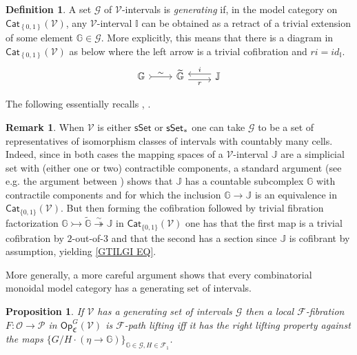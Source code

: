 \documentclass[a4paper,10pt
,draft
]{article}%
\numberwithin{equation}{section}
\numberwithin{figure}{section}
\newtheorem{proposition}[equation]{Proposition}%
\theoremstyle{definition} %
\newtheorem{definition}[equation]{Definition}%
\newtheorem{remark}[equation]{Remark}%
\newcommand{\set}[1]{\left\{#1\right\}}%
\newcommand{\Cat}{\mathsf{Cat}}
\newcommand{\F}{\ensuremath{\mathcal F}}
\newcommand{\V}{\ensuremath{\mathcal V}}
\renewcommand{\O}{\ensuremath{\mathcal O}}
\renewcommand{\P}{\ensuremath{\mathcal P}}
\newcommand{\1}{\ensuremath{\mathbbm 1}}%
\begin{document}
\begin{definition}
	A set $\mathscr{G}$ of $\V$-intervals is \textit{generating} if,
	in the model category on $\Cat_{\set{0,1}}(\V)$,
	any $\V$-interval $\mathbb{I}$ can be obtained
	as a retract of a trivial extension of some element
	$\mathbb{G} \in \mathscr{G}$.
	More explicitly, this means that there is a diagram in 
	$\Cat_{\set{0,1}}(\V)$ as below
	where the left arrow is a trivial cofibration and
	$ri = id_{\mathbb{I}}$.
\begin{equation}\label{GTILGI EQ}
	\begin{tikzcd}
		\mathbb{G} \arrow[r,rightarrowtail, "\sim"]
	&
		\widetilde{\mathbb{G}} \arrow[r,yshift=-.3em, "r"']
	&
		\mathbb{J} \arrow[l,yshift=.3em, "i"']
	\end{tikzcd}
\end{equation}
\end{definition}


The following essentially recalls \cite[1.20]{CM13b}, \cite[\S 4.3]{Cav}.


\begin{remark}
When $\V$ is either $\mathsf{sSet}$ or $\mathsf{sSet}_{\**}$
one can take $\mathscr{G}$ to be a set of representatives of isomorphism classes of intervals with countably many cells.
Indeed, since in both cases the mapping spaces of a $\V$-interval
$\mathbb{J}$ are a simplicial set with (either one or two) contractible components,
a standard argument (see e.g. the argument between \cite[Lemmas 4.2,4.3]{Ber07b})
shows that $\mathbb{J}$ has a countable subcomplex $\mathbb{G}$ with contractile components and
for which the inclusion 
$\mathbb{G} \to \mathbb{J}$
is an equivalence in $\mathsf{Cat}_{\{0,1\}}(\V)$.
But then forming the cofibration followed by trivial fibration factorization
$\mathbb{G} \rightarrowtail \widetilde{\mathbb{G}}
\overset{\sim}{\twoheadrightarrow} \mathbb{J}$
in $\mathsf{Cat}_{\{0,1\}}(\V)$
one has that the first map is a trivial cofibration by $2$-out-of-$3$
and that the second has a section since $\mathbb{J}$ is cofibrant by assumption, yielding \eqref{GTILGI EQ}.

More generally, a more careful argument \cite[Lemma 1.12]{BM13}
shows that every combinatorial monoidal model category
has a generating set of intervals.
\end{remark}



\begin{proposition}\label{GENIN PROP}
If $\V$ has a generating set of intervals $\mathscr{G}$ then a local $\F$-fibration 
$F \colon \O \to \P$ in 
$\mathsf{Op}^G_{\mathfrak{C}}(\V)$
is $\F$-path lifting iff it has the right lifting property against the maps 
$\{G/H \cdot (\eta \to \mathbb{G})\}_{\mathbb{G}\in \mathscr{G},H \in \mathcal{F}_1}$.
\end{proposition}
\end{document}
